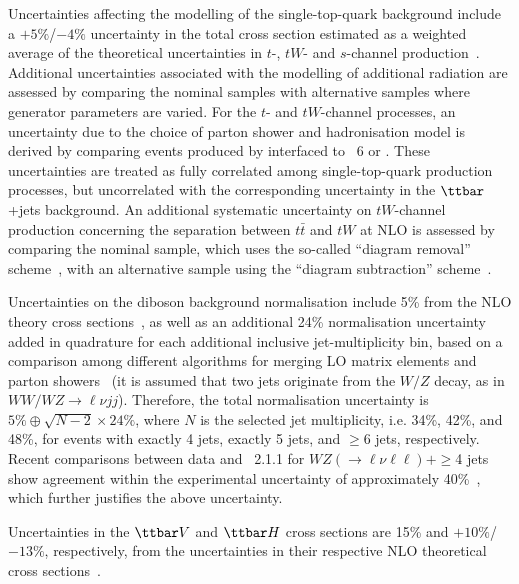 Uncertainties affecting the modelling of the single-top-quark background include a 
$+5\%$/$-4\%$ uncertainty in the total cross section estimated as a weighted average 
of the theoretical uncertainties in $t$-, $tW$- and $s$-channel production~\cite{Kidonakis:2011wy,Kidonakis:2010ux,Kidonakis:2010tc}.
Additional uncertainties associated with the modelling of additional radiation are assessed by comparing the nominal
samples with alternative samples where generator parameters are varied.
For the $t$- and $tW$-channel processes, an uncertainty due to the choice of parton shower and hadronisation model is derived 
by comparing events produced by {\powheg} interfaced to {\pythia}~6 or {\herwigpp}.
These uncertainties are treated as fully correlated among single-top-quark production processes, but uncorrelated with the
corresponding uncertainty in the $\ttbar$+jets background.
An additional systematic uncertainty on $tW$-channel production concerning the separation 
between $t\bar{t}$ and $tW$ at NLO is assessed by comparing
the nominal sample, which uses the so-called ``diagram removal'' scheme~\cite{Frixione:2008yi}, with an alternative sample
using the ``diagram subtraction'' scheme~\cite{Frixione:2008yi}.

Uncertainties on the diboson background normalisation include 5\% from the NLO theory cross sections~\cite{Campbell:1999ah},
as well as an additional 24\% normalisation uncertainty added in quadrature for each additional inclusive jet-multiplicity bin, based on a 
comparison among different algorithms for merging LO matrix elements and parton showers~\cite{Alwall:2007fs}
(it is assumed that two jets originate from the $W/Z$ decay, as in $WW/WZ \to \ell \nu jj$). 
Therefore, the total normalisation uncertainty is $5\% \oplus \sqrt{N-2}\times 24\%$, where $N$ is the selected jet multiplicity,  
i.e. 34\%, 42\%, and 48\%, for events with exactly 4 jets, exactly 5 jets, and $\geq$6 jets, respectively.
Recent comparisons between data and {\sherpa}~2.1.1 for $WZ(\to \ell\nu\ell\ell) + \geq$4 jets show
agreement within the experimental uncertainty of approximately 40\%~\cite{Aaboud:2016yus}, which further justifies the above uncertainty.

Uncertainties in the $\ttbar V$ and $\ttbar H$ cross sections are 15\% and $+10\%$/$-13\%$, respectively,
from the uncertainties in their respective NLO theoretical cross sections~\cite{Campbell:2012dh,Garzelli:2012bn,deFlorian:2016spz}. 

